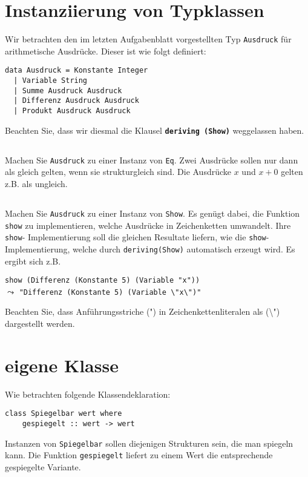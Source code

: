 \documentclass[
  10pt,                   %
  DIV12,
  german,                 %
  oneside,                %
  parskip=half,           %
  headings=normal,        %
  captions=tableheading,  %
]{scrartcl}
\begin{document}
\section{Instanziierung von Typklassen}
Wir betrachten den im letzten Aufgabenblatt vorgestellten Typ \lstinline|Ausdruck| für
arithmetische Ausdrücke. Dieser ist wie folgt definiert:
\begin{lstlisting}
data Ausdruck = Konstante Integer
  | Variable String
  | Summe Ausdruck Ausdruck
  | Differenz Ausdruck Ausdruck
  | Produkt Ausdruck Ausdruck
\end{lstlisting}
Beachten Sie, dass wir diesmal die Klausel \textbf{\lstinline|deriving (Show)|} weggelassen haben.
\subsection{}
Machen Sie \lstinline|Ausdruck| zu einer Instanz von \lstinline|Eq|. Zwei Ausdrücke
sollen nur dann als gleich gelten, wenn sie strukturgleich sind. Die Ausdrücke
$x$ und $x + 0$ gelten z.B. als ungleich.
\subsection{}
Machen Sie \lstinline|Ausdruck| zu einer Instanz von \lstinline|Show|. Es genügt dabei, die Funktion \lstinline|show|
zu implementieren, welche Ausdrücke in Zeichenketten umwandelt. Ihre \lstinline|show|-
Implementierung soll die gleichen Resultate liefern, wie die \lstinline|show|-Implementierung,
welche durch \lstinline|deriving(Show)| automatisch erzeugt wird. Es ergibt sich z.B.
\begin{center}
\lstinline|show (Differenz (Konstante 5) (Variable "x"))|\\
$\leadsto$ \lstinline|"Differenz (Konstante 5) (Variable \"x\")"|
\end{center}
Beachten Sie, dass Anführungsstriche (") in Zeichenkettenliteralen als (\textbackslash") dargestellt
werden.
\section{eigene Klasse}
Wie betrachten folgende Klassendeklaration:
\begin{lstlisting}
class Spiegelbar wert where
	gespiegelt :: wert -> wert
\end{lstlisting}
Instanzen von \lstinline|Spiegelbar| sollen diejenigen Strukturen sein, die man spiegeln kann. Die
Funktion \lstinline|gespiegelt| liefert zu einem Wert die entsprechende gespiegelte Variante.
\end{document}
